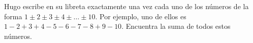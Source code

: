 Hugo escribe en su libreta exactamente una vez cada uno de los números de la forma $1\pm2\pm3\pm4\pm\dots\pm10$. Por ejemplo, uno de ellos es $1-2+3+4-5-6-7-8+9-10$. Encuentra la suma de todos estos números.